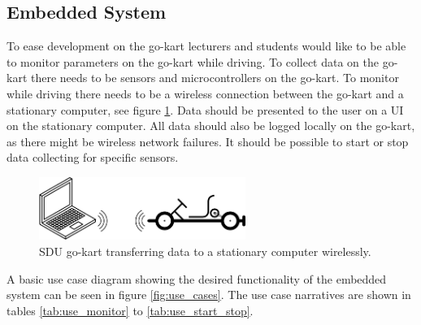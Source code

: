 \subsection{Embedded System}
To ease development on the go-kart lecturers and students would like to be able to monitor parameters on the go-kart while driving.
To collect data on the go-kart there needs to be sensors and microcontrollers on the go-kart.
To monitor while driving there needs to be a wireless connection between the go-kart and a stationary computer, see figure \ref{fig:simple}.
Data should be presented to the user on a UI on the stationary computer.
All data should also be logged locally on the go-kart, as there might be wireless network failures. 
It should be possible to start or stop data collecting for specific sensors.
\begin{figure}[h]
 	\centering
    \includegraphics[width=0.6\textwidth]{graphics/go_kart_network_simple}
    \caption{SDU go-kart transferring data to a stationary computer wirelessly.}
    \label{fig:simple}
\end{figure}

A basic use case diagram showing the desired functionality of the embedded system can be seen in figure \ref{fig:use_cases}.
The use case narratives are shown in tables \ref{tab:use_monitor} to \ref{tab:use_start_stop}.








